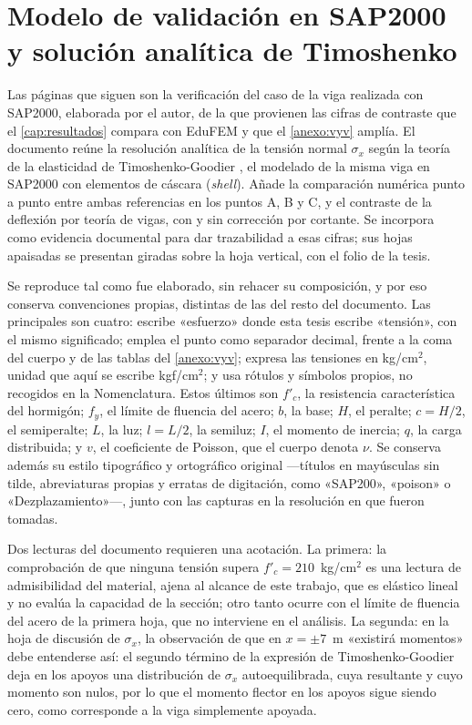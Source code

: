 \chapter{Modelo de validación en SAP2000 y solución analítica de Timoshenko}
\label{anexo:sap2000}

Las páginas que siguen son la verificación del caso de la viga realizada con SAP2000, elaborada por el autor, de la que provienen las cifras de contraste que el \autoref{cap:resultados} compara con EduFEM y que el \autoref{anexo:vyv} amplía. El documento reúne la resolución analítica de la tensión normal $\sigma_x$ según la teoría de la elasticidad de Timoshenko-Goodier \autocite[art.~21, pp.~39-43]{timoshenko1970elasticity}, el modelado de la misma viga en SAP2000 \autocite[p.~179]{csi2017sap2000} con elementos de cáscara (\emph{shell}). Añade la comparación numérica punto a punto entre ambas referencias en los puntos A, B y C, y el contraste de la deflexión por teoría de vigas, con y sin corrección por cortante. Se incorpora como evidencia documental para dar trazabilidad a esas cifras; sus hojas apaisadas se presentan giradas sobre la hoja vertical, con el folio de la tesis.

Se reproduce tal como fue elaborado, sin rehacer su composición, y por eso conserva convenciones propias, distintas de las del resto del documento. Las principales son cuatro: escribe «esfuerzo» donde esta tesis escribe «tensión», con el mismo significado; emplea el punto como separador decimal, frente a la coma del cuerpo y de las tablas del \autoref{anexo:vyv}; expresa las tensiones en kg/cm$^2$, unidad que aquí se escribe kgf/cm$^2$; y usa rótulos y símbolos propios, no recogidos en la Nomenclatura. Estos últimos son $f'_c$, la resistencia característica del hormigón; $f_y$, el límite de fluencia del acero; $b$, la base; $H$, el peralte; $c = H/2$, el semiperalte; $L$, la luz; $l = L/2$, la semiluz; $I$, el momento de inercia; $q$, la carga distribuida; y $v$, el coeficiente de Poisson, que el cuerpo denota $\nu$. Se conserva además su estilo tipográfico y ortográfico original —títulos en mayúsculas sin tilde, abreviaturas propias y erratas de digitación, como «SAP200», «poison» o «Dezplazamiento»—, junto con las capturas en la resolución en que fueron tomadas.

Dos lecturas del documento requieren una acotación. La primera: la comprobación de que ninguna tensión supera $f'_c = 210$~kg/cm$^2$ es una lectura de admisibilidad del material, ajena al alcance de este trabajo, que es elástico lineal y no evalúa la capacidad de la sección; otro tanto ocurre con el límite de fluencia del acero de la primera hoja, que no interviene en el análisis. La segunda: en la hoja de discusión de $\sigma_x$, la observación de que en $x = \pm 7$~m «existirá momentos» debe entenderse así: el segundo término de la expresión de Timoshenko-Goodier deja en los apoyos una distribución de $\sigma_x$ autoequilibrada, cuya resultante y cuyo momento son nulos, por lo que el momento flector en los apoyos sigue siendo cero, como corresponde a la viga simplemente apoyada.

